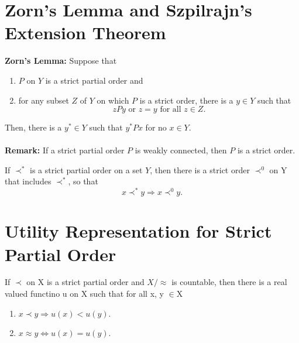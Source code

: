 \documentclass[10pt,a4paper,oneside]{article}
\begin{document}
\section{Zorn's Lemma and Szpilrajn's Extension Theorem}
{\bf Zorn's Lemma:} Suppose that 
\begin{enumerate}[label=(\roman*),leftmargin=*]
	\item $P$ on $Y$ is a strict partial order and 
	\item for any subset $Z$ of $Y$ on which $P$ is a strict order, there is a $y \in Y$ such that $$zPy \text{ or } z=y\text{ for all }z \in Z.$$ 
\end{enumerate}
Then, there is a $y^* \in Y$ such that $y^* P x$ for no $x \in Y$.\\ \\
{\bf Remark:} If a strict partial order $P$ is weakly connected, then $P$ is a strict order.\\
\begin{Thm}
	If $\prec^*$ is a strict partial order on a set $Y$, then there is a strict order $\prec^0$ on Y that includes $\prec^*$, so that $$ x \prec^* y \Rightarrow x \prec^0 y.$$
\end{Thm}
\section{Utility Representation for Strict Partial Order}
\begin{Thm}
	If $\prec$ on X is a strict partial order and $X/\approx$ is countable, then there is a real valued functino u on X such that for all x, y $\in $X
	\begin{enumerate}[label=\arabic*.]
	\item $x \prec y \Rightarrow u(x)<u(y).$
	\item $x \approx y \Leftrightarrow u(x)=u(y).$
	\end{enumerate}
\end{Thm}
\end{document}
